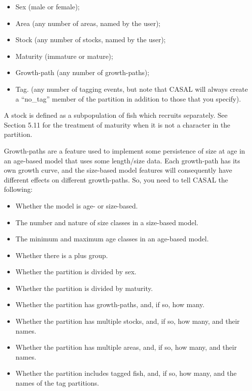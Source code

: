 \begin{itemize}
\item Sex (male or female);
\item Area (any number of areas, named by the user);
\item Stock (any number of stocks, named by the user);
\item Maturity (immature or mature);
\item Growth-path (any number of growth-paths);
\item Tag. (any number of tagging events, but note that CASAL will always create a “no\_tag” member of the partition in addition to those that you specify).
\end{itemize}

A stock is defined as a subpopulation of fish which recruits separately. See Section 5.11 for the treatment of maturity when it is not a character in the partition. 

Growth-paths are a feature used to implement some persistence of size at age in an age-based model that uses some length/size data. Each growth-path has its own growth curve, and the size-based model features will consequently  have different effects on different growth-paths. So, you need to tell CASAL the following: 

\begin{itemize}
\item Whether the model is age- or size-based.
\item The number and nature of size classes in a size-based model.
\item	The minimum and maximum age classes in an age-based model.
\item	Whether there is a plus group.
\item	Whether the partition is divided by sex.
\item	Whether the partition is divided by maturity.
\item	Whether the partition has growth-paths, and, if so, how many.
\item	Whether the partition has multiple stocks, and, if so, how many, and their names.
\item	Whether the partition has multiple areas, and, if so, how many, and their names.
\item	Whether the partition includes tagged fish, and, if so, how many, and the names of the tag partitions.
\end{itemize}

